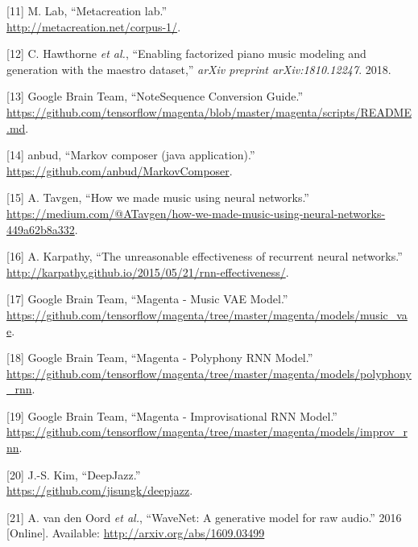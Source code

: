 \documentclass[12pt,]{article}
\begin{document}
\leavevmode\hypertarget{ref-metacreation}{}%
{[}11{]} M. Lab, ``Metacreation lab.'' \\
\url{http://metacreation.net/corpus-1/}.

\leavevmode\hypertarget{ref-maestro2018}{}%
{[}12{]} C. Hawthorne \emph{et al.}, ``Enabling factorized piano music
modeling and generation with the maestro dataset,'' \emph{arXiv preprint
arXiv:1810.12247}. 2018.

\leavevmode\hypertarget{ref-notesequences}{}%
{[}13{]} \relax Google Brain Team, ``NoteSequence Conversion Guide.'' \\
\url{https://github.com/tensorflow/magenta/blob/master/magenta/scripts/README.md}.

\leavevmode\hypertarget{ref-markovcomposer}{}%
{[}14{]} \relax anbud, ``Markov composer (java application).'' \\
\url{https://github.com/anbud/MarkovComposer}.

\leavevmode\hypertarget{ref-alextavgen}{}%
{[}15{]} A. Tavgen, ``How we made music using neural networks.'' \\
\url{https://medium.com/@ATavgen/how-we-made-music-using-neural-networks-449a62b8a332}.

\leavevmode\hypertarget{ref-karpathy}{}%
{[}16{]} A. Karpathy, ``The unreasonable effectiveness of recurrent
neural networks.'' \\
\url{http://karpathy.github.io/2015/05/21/rnn-effectiveness/}.

\leavevmode\hypertarget{ref-magentavae}{}%
{[}17{]} \relax Google Brain Team, ``Magenta - Music VAE Model.'' \\
\url{https://github.com/tensorflow/magenta/tree/master/magenta/models/music_vae}.

\leavevmode\hypertarget{ref-magentapolyphony}{}%
{[}18{]} \relax Google Brain Team, ``Magenta - Polyphony RNN Model.'' \\
\url{https://github.com/tensorflow/magenta/tree/master/magenta/models/polyphony_rnn}.

\leavevmode\hypertarget{ref-magentaimprov}{}%
{[}19{]} \relax Google Brain Team, ``Magenta - Improvisational RNN
Model.'' \\
\url{https://github.com/tensorflow/magenta/tree/master/magenta/models/improv_rnn}.

\leavevmode\hypertarget{ref-deepjazz}{}%
{[}20{]} J.-S. Kim, ``DeepJazz.'' \\
\url{https://github.com/jisungk/deepjazz}.

\leavevmode\hypertarget{ref-oord2016wavenet}{}%
{[}21{]} A. van den Oord \emph{et al.}, ``WaveNet: A generative model
for raw audio.'' 2016 {[}Online{]}. Available:
\url{http://arxiv.org/abs/1609.03499}
\end{document}
